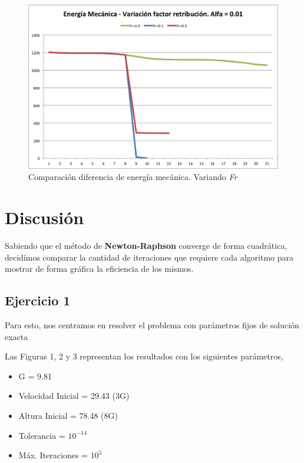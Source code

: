 \documentclass[a4paper]{article}
\begin{document}
\begin{figure}[H]
  \centering
  \includegraphics[scale=0.75]{graficos/5-energiaMecanica-fr.png}
  \caption{Comparación diferencia de energía mecánica. Variando \textit{Fr} }
\end{figure}



\section{Discusión}
Sabiendo que el método de \textbf{Newton-Raphson} converge de forma cuadrática, decidímos comparar la cantidad de iteraciones que requiere cada algoritmo para mostrar de forma gráfica la eficiencia de los mismos. \\

\subsection{Ejercicio 1}
Para esto, nos centramos en resolver el problema con parámetros fijos de solución exacta

Las Figuras 1, 2 y 3 representan los resultados con los siguientes parámetros, 
\begin{itemize}
  \item{G = 9.81}
  \item{Velocidad Inicial = 29.43 (3G)} 
  \item{Altura Inicial = 78.48 (8G)} 
  \item{Tolerancia = $10^{-14}$} 
  \item{Máx. Iteraciones = $10^5$}
\end{itemize}
\end{document}
